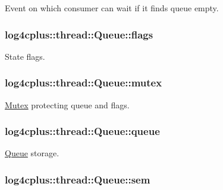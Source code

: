 Event on which consumer can wait if it finds queue empty. 

\hypertarget{classlog4cplus_1_1thread_1_1Queue_aec6bebc2a4b3d0f44598b0cfb1aa6777}{
\subsubsection[{flags}]{ log4cplus\-::thread\-::\-Queue\-::flags\hspace{0.3cm}{\ttfamily [protected]}}}\label{classlog4cplus_1_1thread_1_1Queue_aec6bebc2a4b3d0f44598b0cfb1aa6777}


State flags. 

\hypertarget{classlog4cplus_1_1thread_1_1Queue_affc762dbd7de3adb3757b4d82befccd0}{
\subsubsection[{mutex}]{ log4cplus\-::thread\-::\-Queue\-::mutex\hspace{0.3cm}{\ttfamily [protected]}}}\label{classlog4cplus_1_1thread_1_1Queue_affc762dbd7de3adb3757b4d82befccd0}


\hyperlink{classlog4cplus_1_1thread_1_1Mutex}{Mutex} protecting queue and flags. 

\hypertarget{classlog4cplus_1_1thread_1_1Queue_a553238e42f50ceb87ce0e5baad6188c6}{
\subsubsection[{queue}]{ log4cplus\-::thread\-::\-Queue\-::queue\hspace{0.3cm}{\ttfamily [protected]}}}\label{classlog4cplus_1_1thread_1_1Queue_a553238e42f50ceb87ce0e5baad6188c6}


\hyperlink{classlog4cplus_1_1thread_1_1Queue}{Queue} storage. 

\hypertarget{classlog4cplus_1_1thread_1_1Queue_a0f464e634217be6effe4151f9057aec6}{
\subsubsection[{sem}]{ log4cplus\-::thread\-::\-Queue\-::sem\hspace{0.3cm}{\ttfamily [protected]}}}\label{classlog4cplus_1_1thread_1_1Queue_a0f464e634217be6effe4151f9057aec6}


